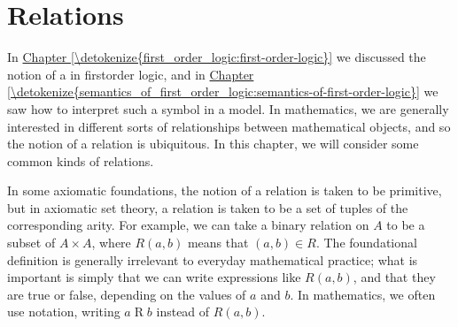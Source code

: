 \documentclass[letterpaper,10pt,english]{sphinxmanual}
\begin{document}
\begin{enumerate}
\begin{quote}
\begin{sphinxVerbatim}[commandchars=\\\{\}]
     
 

            

            
\end{sphinxVerbatim}
\end{quote}

\end{enumerate}


\chapter{Relations}
\label{\detokenize{relations:relations}}\label{\detokenize{relations:id1}}\label{\detokenize{relations::doc}}
\sphinxAtStartPar
In \hyperref[\detokenize{first_order_logic:first-order-logic}]{Chapter \ref{\detokenize{first_order_logic:first-order-logic}}} we discussed the notion of a  in first\sphinxhyphen{}order logic, and in \hyperref[\detokenize{semantics_of_first_order_logic:semantics-of-first-order-logic}]{Chapter \ref{\detokenize{semantics_of_first_order_logic:semantics-of-first-order-logic}}} we saw how to interpret such a symbol in a model. In mathematics, we are generally interested in different sorts of relationships between mathematical objects, and so the notion of a relation is ubiquitous. In this chapter, we will consider some common kinds of relations.

\sphinxAtStartPar
In some axiomatic foundations, the notion of a relation is taken to be primitive, but in axiomatic set theory, a relation is taken to be a set of tuples of the corresponding arity. For example, we can take a binary relation on \(A\) to be a subset of \(A \times A\), where \(R(a, b)\) means that \((a, b) \in R\). The foundational definition is generally irrelevant to everyday mathematical practice; what is important is simply that we can write expressions like \(R(a, b)\), and that they are true or false, depending on the values of \(a\) and \(b\). In mathematics, we often use  notation, writing \(a \mathrel{R} b\) instead of \(R(a, b)\).
\end{document}
